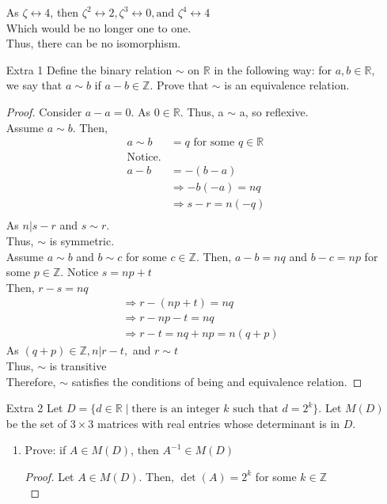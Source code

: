 \documentclass[12pt]{article}
\newcommand{\Z}{\mathds{Z}}
\newcommand{\R}{\mathbb{R}}
\begin{document}
\begin{enumerate}
		As $\zeta \leftrightarrow 4$, then $\zeta^2 \leftrightarrow 2, \zeta^3 \leftrightarrow 0, \text{and } \zeta^4 \leftrightarrow 4$ \\
		Which would be no longer one to one. \\
		Thus, there can be no isomorphism.
	\item[Extra 1] Define the binary relation $\sim$ on $\mathbb{R}$ in the following way: for $a,b \in \mathbb{R}$, we say that $a \sim b$ if $a-b \in \mathbb{Z}$. Prove that $\sim$ is an equivalence relation.
		\begin{proof}
			Consider $a-a=0$. As $0 \in \R$. Thus, a $\sim$ a, so reflexive.\\
			Assume $a \sim b$. Then, 
			$$
			\begin{aligned}
			a \sim b &= q \text{ for some } q \in \R\\
			\text{Notice.}\\
			a-b&=-(b-a) \\
			&\Rightarrow -b(-a)=nq\\
			&\Rightarrow s-r = n(-q)\\
			\end{aligned}
			$$
			As $n|s-r$ and $s\sim r$.\\
			Thus, $\sim$ is symmetric.\\
			Assume $a\sim b$ and $b \sim c$ for some $c \in \Z$. Then, $a-b=nq$ and $b-c=np$ for some $p\in \Z$. Notice $s=np+t$\\
			Then, $r-s = nq$
			$$\begin{aligned}
			&\Rightarrow r-(np+t)=nq \\
			&\Rightarrow r-np-t=nq \\
			&\Rightarrow r-t=nq+np=n(q+p)
			\end{aligned}$$
			As $(q+p) \in \Z, n|r-t,$ and $r\sim t$ \\
			Thus, $\sim$ is transitive \\
			Therefore, $\sim$ satisfies the conditions of being and equivalence relation.
		\end{proof}
	\item[Extra 2] Let $D=\{d \in \mathbb{R} \mid \text{there is an integer } k \text{ such that } d=2^k\}$. Let $M(D)$ be the set of $3 \times 3$ matrices with real entries whose determinant is in $D$.
	\begin{enumerate}
		\item Prove: if $A \in M(D)$, then $A^{-1} \in M(D)$
			\begin{proof}
				Let $A\in M(D)$. Then, $\det(A)=2^k$ for some $k\in \Z$\\

\end{proof}
\end{enumerate}
\end{enumerate}
\end{document}
